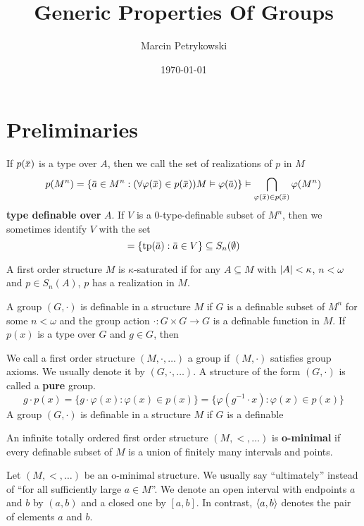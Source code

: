 \documentclass[11pt]{article}
\author{Marcin Petrykowski}
\date{\today}
\title{Generic Properties Of Groups}
\begin{document}
\maketitle
\tableofcontents


\section{Preliminaries}
\label{sec:orgf78afc1}
If \(p(\barx)\) is a type over \(A\), then we call the set of realizations of \(p\) in \(M\)
\begin{equation*}
p(M^n)=\{\bara\in M^n:(\forall\varphi(\barx)\in p(\barx))M\vDash\varphi(\bara)\}\vDash\bigcap_{\varphi(\barx)\in p(\barx)}\varphi(M^n)
\end{equation*}
\textbf{type definable over} \(A\). If \(V\) is a 0-type-definable subset of \(M^n\), then we sometimes
 identify \(V\) with the set
 \begin{equation*}
[V]=\{\tp(\bara):\bara\in V\}\subseteq S_n(\emptyset)
 \end{equation*}

A first order structure \(M\) is \(\kappa\)-saturated if for any \(A\subseteq M\) with \(\abs{A}<\kappa\), \(n<\omega\)
and \(p\in S_n(A)\), \(p\) has a realization in \(M\).

A group \((G,\cdot)\) is definable in a structure \(M\) if \(G\) is a definable subset of \(M^n\)
for some \(n<\omega\) and the group action \(\cdot:G\times G\to G\) is a definable function in \(M\).
If \(p(x)\) is a type over \(G\) and \(g\in G\), then

We call a first order structure \((M,\cdot,\dots)\) a group if \((M,\cdot)\) satisfies group axioms. We
usually denote it by \((G,\cdot,\dots)\). A structure of the form \((G,\cdot)\) is called a \textbf{pure} group.
 \begin{equation*}
g\cdot p(x)=\{g\cdot\varphi(x):\varphi(x)\in p(x)\}=\{\varphi(g^{-1}\cdot x):\varphi(x)\in p(x)\}
 \end{equation*}
A group \((G,\cdot)\) is definable in a structure \(M\) if \(G\) is a definable

An infinite totally ordered first order structure \((M,<,\dots)\) is \textbf{o-minimal} if every definable
subset of \(M\) is a union of finitely many intervals and points.

Let \((M,<,\dots)\) be an o-minimal structure. We usually say ``ultimately'' instead of ``for all
sufficiently large \(a\in M\)''. We denote an open interval with endpoints \(a\) and \(b\)
by \((a,b)\) and a closed one by \([a,b]\). In contrast, \(\langle a,b\rangle\) denotes the pair of
elements \(a\) and \(b\).
\end{document}

